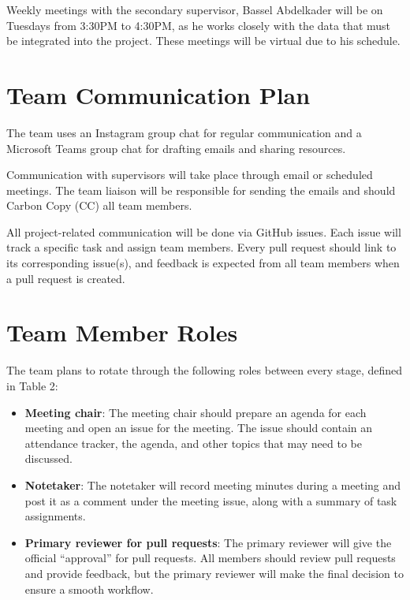 \documentclass{article}
\begin{document}
\noindent Weekly meetings with the secondary supervisor, Bassel Abdelkader will be on Tuesdays from 3:30PM to 4:30PM, as he works closely with the data 
that must be integrated into the project. These meetings will be virtual due
to his schedule.

\section{Team Communication Plan}

The team uses an Instagram group chat for regular communication and a Microsoft Teams group chat for drafting emails and sharing resources.\newline

\noindent Communication with supervisors will take place through email or scheduled meetings.
The team liaison will be responsible for sending the emails and should Carbon Copy (CC) all team members.\newline

\noindent All project-related communication will be done via GitHub issues. Each issue will track a specific task and assign team members. Every pull request should link to its 
corresponding issue(s), and feedback is expected from all team members when a pull request is created.

\section{Team Member Roles}

The team plans to rotate through the following roles between every stage, defined
in Table 2:

\begin{itemize}
  \item \textbf{Meeting chair}: The meeting chair should prepare an agenda for each
  meeting and open an issue for the meeting. The issue should contain an attendance
  tracker, the agenda, and other topics that may need to be discussed.
  \item \textbf{Notetaker}: The notetaker will record meeting minutes during a 
  meeting and post it as a comment under the meeting issue, along with a summary of 
  task assignments.
  \item \textbf{Primary reviewer for pull requests}: The primary reviewer will give
  the official ``approval'' for pull requests. All members should review pull requests
  and provide feedback, but the primary reviewer will make the final decision to
  ensure a smooth workflow.
\end{itemize}
\end{document}
